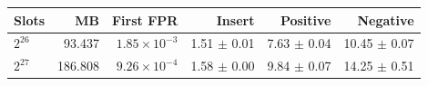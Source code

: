 \begin{tabular}{@{}lrrrrr@{}}
\toprule
\textbf{Slots} & \textbf{MB} & \textbf{First FPR} & \textbf{Insert} & \textbf{Positive} & \textbf{Negative} \\
\midrule
$2^{26}$ & 93.437 & $1.85\times10^{-3}$ & 1.51 $\pm$ 0.01 & 7.63 $\pm$ 0.04 & 10.45 $\pm$ 0.07 \\
$2^{27}$ & 186.808 & $9.26\times10^{-4}$ & 1.58 $\pm$ 0.00 & 9.84 $\pm$ 0.07 & 14.25 $\pm$ 0.51 \\
\bottomrule
\end{tabular}
